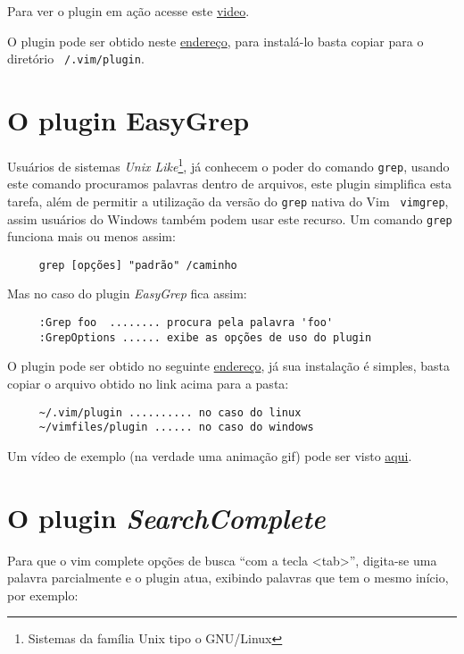 Para ver o plugin em ação acesse este
\href{http://vimeo.com/2938498}{video}.

O plugin pode ser obtido neste
\href{http://www.vim.org/scripts/script.php?script\_id=1984}{endereço},
para instalá-lo basta copiar para o diretório 
{\tt ~/.vim/plugin}.

\section{O plugin EasyGrep}
\label{sec:O plugin EasyGrep}

Usuários de sistemas {\em Unix Like}\footnote{Sistemas da família Unix tipo o
GNU/Linux}, já conhecem o poder do comando {\tt grep}, usando este comando
procuramos palavras dentro de arquivos, este plugin simplifica esta tarefa,
além de permitir a utilização da versão do {\tt grep} nativa do Vim {\tt
vimgrep}, assim usuários do Windows também podem usar este recurso. Um comando
{\tt grep} funciona mais ou menos assim:

\begin{verbatim}
     grep [opções] "padrão" /caminho
\end{verbatim}

Mas no caso do plugin {\em EasyGrep} fica assim:

\begin{verbatim}
     :Grep foo  ........ procura pela palavra 'foo'
     :GrepOptions ...... exibe as opções de uso do plugin
\end{verbatim}

O plugin pode ser obtido no seguinte
\href{http://www.vim.org/scripts/script.php?script\_id=2438#0.9}{endereço}, já sua instalação
é simples, basta copiar o arquivo obtido no link acima para a pasta:
   
\begin{verbatim}
     ~/.vim/plugin .......... no caso do linux
     ~/vimfiles/plugin ...... no caso do windows
\end{verbatim}

Um vídeo de exemplo (na verdade uma animação gif) pode ser visto
\href{http://downloads.veryspeedy.net/vim/EasyGrep.gif}{aqui}.

\section{O plugin {\em SearchComplete}}
Para que o vim complete opções de busca ``com a tecla <tab>'', digita-se uma
palavra parcialmente e o plugin atua, exibindo palavras que tem 
o mesmo início, por exemplo:


